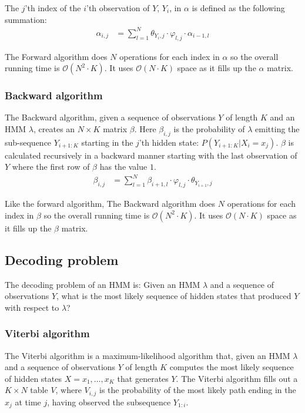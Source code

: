 The $j$'th index of the $i$'th observation of $Y$, $Y_i$, in $\alpha$ is defined as the following summation: 
\begin{align*}
    \alpha_{i,j} &= \sum\limits_{l=1}^{N} \theta_{Y_i,j}\cdot\varphi_{l,j}\cdot\alpha_{i-1,l}
\end{align*}

The Forward algorithm does $ N $ operations for each index in $\alpha$ so the overall running time is $\mathcal{O}( N ^2\cdot K)$. It uses $\mathcal{O}( N \cdot K)$ space as it fills up the $\alpha$ matrix.

\subsubsection{Backward algorithm}

The Backward algorithm\cite{Bishop}, given a sequence of observations $Y$ of length $K$ and an HMM $\lambda$, creates an $ N \times K$ matrix $\beta$. Here $\beta_{i,j}$ is the probability of $\lambda$ emitting the sub-sequence $Y_{i+1:K}$ starting in the $j$'th hidden state: $P(Y_{i+1:K}|X_i = x_j)$. 
$\beta$ is calculated recursively in a backward manner starting with the last observation of $Y$ where the first row of $\beta$ has the value $1$.
\begin{align*}
    \beta_{i,j} &= \sum\limits_{l=1}^{N} \beta_{i+1,l}\cdot\varphi_{l,j}\cdot\theta_{Y_{i+1},j}
\end{align*}

Like the forward algorithm, The Backward algorithm does $ N $ operations for each index in $\beta$ so the overall running time is $\mathcal{O}( N ^2\cdot K)$. It uses $\mathcal{O}( N \cdot K)$ space as it fills up the $\beta$ matrix.

\subsection{Decoding problem}

The decoding problem of an HMM is: Given an HMM $\lambda$ and a sequence of observations $Y$, what is the most likely sequence of hidden states that produced $Y$ with respect to $\lambda$? 

\subsubsection{Viterbi algorithm}

The Viterbi algorithm\cite{Bishop} is a maximum-likelihood algorithm that, given an HMM $\lambda$ and a sequence of observations $Y$ of length $K$ computes the most likely sequence of hidden states $X = x_1,\ldots,x_K$ that generates $Y$. 
The Viterbi algorithm fills out a $K \times N$ table $V$, where $V_{i,j}$ is the probability of the most likely path ending in the $x_j$ at time $j$, having observed the subsequence $Y_{1:i}$.

